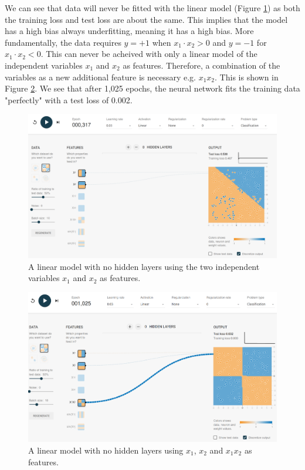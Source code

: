 We can see that data will never be fitted with the linear model (Figure \ref{fig:x1_x2_feat}) as both the training loss and test loss are about the same. This implies that the model has a high bias always underfitting, meaning it has a high bias. More fundamentally, the data requires $y=+1$ when $x_1\cdot x_2>0$ and $y=-1$ for $x_1\cdot x_2<0$. This can never be acheived with only a linear model of the independent variables $x_1$ and $x_2$ as features. Therefore, a combination of the variables as a new additional feature is necessary e.g. $x_1x_2$. This is shown in Figure \ref{fig:x1_x2_x1x2_feat}. We see that after 1,025 epochs, the neural network fits the training data "perfectly" with a test loss of 0.002. 
\begin{figure}[htbp]
    \centering
    \includegraphics[width = 0.9\linewidth]{img/x1_x2_feat.png}
    \caption{A linear model with no hidden layers using the two independent variables $x_1$ and $x_2$ as features. }
    \label{fig:x1_x2_feat}
\end{figure}
\begin{figure}[htbp]
    \centering
    \includegraphics[width = 0.9\linewidth]{img/x1_x2_x1x2_feat.png}
    \caption{A linear model with no hidden layers using $x_1$, $x_2$ and $x_1x_2$ as features. }
    \label{fig:x1_x2_x1x2_feat}
\end{figure}
\newpage

